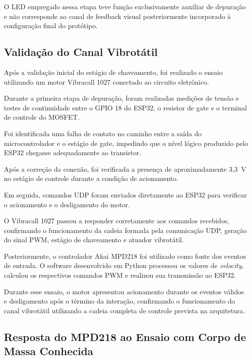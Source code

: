 O LED empregado nessa etapa teve função exclusivamente auxiliar de depuração e não corresponde ao canal de feedback visual posteriormente incorporado à configuração final do protótipo.


\subsection{Validação do Canal Vibrotátil}

Após a validação inicial do estágio de chaveamento, foi realizado o ensaio utilizando um motor Vibracall 1027 conectado ao circuito eletrônico.

Durante a primeira etapa de depuração, foram realizadas medições de tensão e testes de continuidade entre o GPIO 18 do ESP32, o resistor de gate e o terminal de controle do MOSFET.

Foi identificada uma falha de contato no caminho entre a saída do microcontrolador e o estágio de gate, impedindo que o nível lógico produzido pelo ESP32 chegasse adequadamente ao transistor.

Após a correção da conexão, foi verificada a presença de aproximadamente 3,3~V no estágio de controle durante a condição de acionamento.

Em seguida, comandos UDP foram enviados diretamente ao ESP32 para verificar o acionamento e o desligamento do motor.

O Vibracall 1027 passou a responder corretamente aos comandos recebidos, confirmando o funcionamento da cadeia formada pela comunicação UDP, geração do sinal PWM, estágio de chaveamento e atuador vibrotátil.

Posteriormente, o controlador Akai MPD218 foi utilizado como fonte dos eventos de entrada. O software desenvolvido em Python processou os valores de \textit{velocity}, calculou os respectivos comandos PWM e realizou sua transmissão ao ESP32.

Durante esse ensaio, o motor apresentou acionamento durante os eventos válidos e desligamento após o término da interação, confirmando o funcionamento do canal vibrotátil utilizando a cadeia completa de controle prevista na arquitetura.



\subsection{Resposta do MPD218 ao Ensaio com Corpo de Massa Conhecida}
\label{sec:resultado_queda_controlada}

